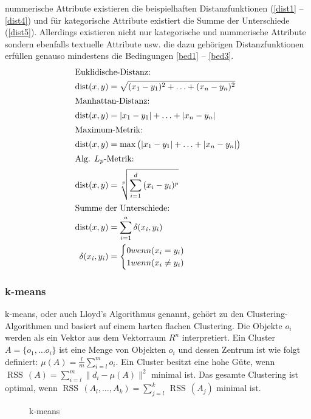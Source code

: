 \documentclass[12pt,journal,compsoc]{IEEEtran}
\DeclareMathOperator{\dist}{dist}
\DeclareMathOperator{\RSS}{RSS}
\begin{document}
 nummerische Attribute existieren die beispielhaften Distanzfunktionen (\ref{dist1} -- \ref{dist4}) und für 
kategorische Attribute existiert die Summe der Unterschiede (\ref{dist5}). 
Allerdings existieren nicht nur kategorische und nummerische Attribute sondern ebenfalls 
textuelle Attribute usw. die dazu gehörigen Distanzfunktionen erfüllen genauso mindestens die
Bedingungen \ref{bed1} -- \ref{bed3}.
{
\setlength{\jot}{0pt}
\small
\begin{align}
\intertext{Euklidische-Distanz:} 
\dist(x,y) &= \sqrt{(x_1 - y_1)^2 + \ldots + (x_n - y_n)^2}\label{dist1}\\
\intertext{Manhattan-Distanz:}
\dist(x,y) &= |x_1 - y_1| + \ldots + |x_n - y_n|\label{dist2}\\
\intertext{Maximum-Metrik:} 
\dist(x,y) &= \max\big(|x_1 - y_1| + \ldots + |x_n - y_n|\big)\label{dist3}\\
\intertext{Alg. $L_p$-Metrik:}
\dist(x,y) &= \sqrt[p]{\sum\limits_{i=1}^{d}{(x_i-y_i)^p}}\label{dist4}\\
\intertext{Summe der Unterschiede:} 
 \dist(x,y) &= \sum\limits_{i=1}^{a}\delta(x_i, y_i)\label{dist5}\\
 \delta(x_i, y_i) &= \begin{cases}
 0 \mbox{ wenn } (x_i = y_i)\\
 1 \mbox{ wenn } (x_i \neq y_i)
 \end{cases} 
 \end{align} 
 }
\subsubsection{k-means} \label{k-means}
 k-means, oder auch Lloyd's Algorithmus genannt, gehört zu den Clustering-Algorithmen und basiert auf 
einem harten flachen Clustering. Die Objekte $o_i$ werden als ein Vektor aus dem 
Vektorraum $R^n$ interpretiert. Ein Cluster $A = \{o_1, \ldots o_i\}$ ist eine Menge
von Objekten $o_i$ und dessen Zentrum ist wie folgt definiert: 
$\mu(A) = \frac{l}{m}\sum\limits_{i=l}^{m}o_i$. Ein Cluster besitzt eine hohe Güte, 
wenn $\RSS\,(A) = \sum\limits_{i=l}^{m}\big\|d_i - \mu(A)\big\|^2$ minimal ist. 
Das gesamte Clustering ist optimal, wenn $\RSS\,(A_l, \ldots, A_k) = \sum\limits_{j=l}^{k}\,\RSS\,(A_j)$ minimal ist. 

\begin{figure}[!t]
\centering
\subfigure[Phase 1 -- 3]{\scalebox{0.5}{}\label{p1-3 k-means}}
\subfigure[Phase 4]{\scalebox{0.5}{}\label{p4 k-means}}
\subfigure[Phase 5]{\scalebox{0.5}{}\label{p5 k-means}}
\subfigure[Phase 6]{\scalebox{0.5}{}\label{p6 k-means}}
\caption{k-means}
\label{k-means 1-6}
\end{figure}
\end{document}
